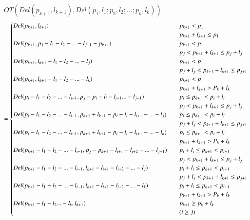 $OT(Del(p_{k+1},l_{k+1}),Del(p_1,l_1;p_2,l_2;...;p_k,l_k))$\\
\begin{equation}
= \begin{cases}
Del(p_{k+1},l_{k+1}) \quad &p_{k+1} < p_1 \quad \\ &p_{k+1}+l_{k+1} \le p_1 \\
Del(p_{k+1},p_j-l_1-l_2-...-l_{j-1}-p_{k+1}) \quad &p_{k+1} < p_1 \quad \\ &p_j < p_{k+1}+l_{k+1} \le p_j+l_j \\
Del(p_{k+1},l_{k+1}-l_1-l_2-...-l_j) \quad &p_{k+1} < p_1 \quad \\& p_j+l_j < p_{k+1}+l_{k+1} \le p_{j+1} \\
Del(p_{k+1},l_{k+1}-l_1-l_2-...-l_k) \quad &p_{k+1} < p_1 \quad \\& p_{k+1}+l_{k+1} > P_k+l_k  \\

Del(p_i-l_1-l_2-...-l_{i-1},p_j-p_i-l_i-l_{i+1}...-l_{j-1})        \quad &p_i \le p_{k+1} < p_i+l_i \quad \\ &p_j < p_{k+1}+l_{k+1} \le p_j+l_j \\
Del(p_i-l_1-l_2-...-l_{i-1},p_{k+1}+l_{k+1}-p_i-l_i-l_{i+1}-...-l_j) \quad &p_i \le p_{k+1} < p_i+l_i \quad \\& p_j+l_j < p_{k+1}+l_{k+1} \le p_{j+1} \\
Del(p_i-l_1-l_2-...-l_{i-1},p_{k+1}+l_{k+1}-p_i-l_i-l_{i+1}-...-l_k) \quad &p_i \le p_{k+1} < p_i+l_i \quad \\& p_{k+1}+l_{k+1} > P_k+l_k  \\


Del(p_{k+1}-l_1-l_2-...-l_{i-1},p_j-p_{k+1}-l_{i+1}-l_{i+2}-...-l_{j-1})    \quad &p_i+l_i \le p_{k+1} < p_{i+1} \quad \\& p_j < p_{k+1}+l_{k+1} \le p_j+l_j \\
Del(p_{k+1}-l_1-l_2-...-l_{i-1},l_{k+1}-l_{i+1}-l_{i+2}-...-l_j)    \quad &p_i+l_i \le p_{k+1} < p_{i+1} \quad \\& p_j+l_j < p_{k+1}+l_{k+1} \le p_{j+1} \\
Del(p_{k+1}-l_1-l_2-...-l_{i-1},l_{k+1}-l_{i+1}-l_{i+2}-...-l_k)    \quad &p_i+l_i \le p_{k+1} < p_{i+1} \quad \\& p_{k+1}+l_{k+1} > P_k+l_k  \\
Del(p_{k+1}-l_1-l_2...-l_k,l_{k+1}) \quad &p_{k+1} \ge p_k+l_k
\\&(i \ge j)
 \end{cases}\\
\end{equation}



